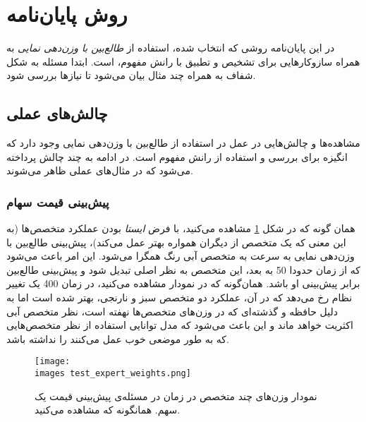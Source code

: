 \documentclass[a4paper,11px]{article}
\begin{document}
\section{
روش پایان‌نامه
}



در این پایان‌نامه روشی که انتخاب شده، استفاده از 
\textit{
طالع‌بین با وزن‌دهی نمایی
} 
به همراه سازوکارهایی برای تشخیص و تطبیق با رانش مفهوم، است. ابتدا مسئله به شکل شفاف به همراه چند مثال بیان می‌شود تا نیازها بررسی شود.

\subsection{
چالش‌های عملی
}

مشاهده‌ها و چالش‌هایی در عمل در استفاده از طالع‌بین با وزن‌دهی نمایی وجود دارد که انگیزه برای بررسی و استفاده از رانش مفهوم است. در ادامه به چند چالش پرداخته می‌شود که در مثال‌های عملی ظاهر می‌شوند.

\subsubsection{
پیش‌بینی قیمت سهام
}



همان گونه که در شکل 
\ref{fig:wmstatic} 
مشاهده می‌کنید، با فرض 
\textit{
ایستا
} 
بودن عملکرد متخصص‌ها (به این معنی که یک متخصص از دیگران همواره بهتر عمل می‌کند)، پیش‌بینی طالع‌بین با وزن‌دهی نمایی به سرعت به متخصص آبی رنگ همگرا می‌شود. این امر باعث می‌شود که از زمان حدودا 50 به بعد، این متخصص به نظر اصلی تبدیل شود و پیش‌بینی طالع‌بین برابر پیش‌بینی او باشد. همان‌گونه که در نمودار مشاهده می‌کنید، در زمان 400 یک تغییر نظام رخ می‌دهد که در آن، عملکرد دو متخصص سبز و نارنجی، بهتر شده است اما به دلیل حافظه و گذشته‌ای که در وزن‌های متخصص‌ها نهفته است، نظر متخصص آبی اکثریت خواهد ماند و این باعث می‌شود که مدل توانایی استفاده از نظر متخصص‌هایی که به طور موضعی خوب عمل می‌کنند را نداشته باشد.


\begin{figure}[h!]
\texttt{[image: \\images test\_expert\_weights.png]}
\caption{
نمودار وزن‌های چند متخصص در زمان در مسئله‌ی پیش‌بینی قیمت یک سهم. همانگونه که مشاهده می‌کنید.
}
\label{fig:wmstatic}
\end{figure}
\end{document}
